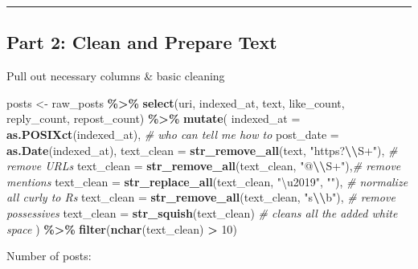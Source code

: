 \documentclass[
]{article}
\newenvironment{Shaded}{\begin{snugshade}}{\end{snugshade}}
\newcommand{\AttributeTok}[1]{\textcolor[rgb]{0.13,0.29,0.53}{#1}}
\newcommand{\CommentTok}[1]{\textcolor[rgb]{0.56,0.35,0.01}{\textit{#1}}}
\newcommand{\DecValTok}[1]{\textcolor[rgb]{0.00,0.00,0.81}{#1}}
\newcommand{\FunctionTok}[1]{\textcolor[rgb]{0.13,0.29,0.53}{\textbf{#1}}}
\newcommand{\NormalTok}[1]{#1}
\newcommand{\OtherTok}[1]{\textcolor[rgb]{0.56,0.35,0.01}{#1}}
\newcommand{\SpecialCharTok}[1]{\textcolor[rgb]{0.81,0.36,0.00}{\textbf{#1}}}
\newcommand{\StringTok}[1]{\textcolor[rgb]{0.31,0.60,0.02}{#1}}
\begin{document}
\begin{center}\rule{0.5\linewidth}{0.5pt}\end{center}

\subsection{Part 2: Clean and Prepare
Text}\label{part-2-clean-and-prepare-text}

Pull out necessary columns \& basic cleaning

\begin{Shaded}
\begin{Highlighting}[]
\NormalTok{posts }\OtherTok{\textless{}{-}}\NormalTok{ raw\_posts }\SpecialCharTok{\%\textgreater{}\%}
  \FunctionTok{select}\NormalTok{(uri, indexed\_at, text, like\_count, reply\_count, repost\_count) }\SpecialCharTok{\%\textgreater{}\%}
  \FunctionTok{mutate}\NormalTok{(}
    \AttributeTok{indexed\_at =} \FunctionTok{as.POSIXct}\NormalTok{(indexed\_at), }\CommentTok{\# who can tell me how to }
    \AttributeTok{post\_date  =} \FunctionTok{as.Date}\NormalTok{(indexed\_at),}
    \AttributeTok{text\_clean =} \FunctionTok{str\_remove\_all}\NormalTok{(text, }\StringTok{"https?}\SpecialCharTok{\textbackslash{}\textbackslash{}}\StringTok{S+"}\NormalTok{), }\CommentTok{\# remove URLs}
    \AttributeTok{text\_clean =} \FunctionTok{str\_remove\_all}\NormalTok{(text\_clean, }\StringTok{"@}\SpecialCharTok{\textbackslash{}\textbackslash{}}\StringTok{S+"}\NormalTok{),}\CommentTok{\# remove mentions}
    \AttributeTok{text\_clean =} \FunctionTok{str\_replace\_all}\NormalTok{(text\_clean, }\StringTok{"\textbackslash{}u2019"}\NormalTok{, }\StringTok{"\textquotesingle{}"}\NormalTok{), }\CommentTok{\# normalize all curly \textquotesingle{} to R\textquotesingle{}s \textquotesingle{}}
    \AttributeTok{text\_clean =} \FunctionTok{str\_remove\_all}\NormalTok{(text\_clean, }\StringTok{"\textquotesingle{}s}\SpecialCharTok{\textbackslash{}\textbackslash{}}\StringTok{b"}\NormalTok{), }\CommentTok{\# remove possessives}
    \AttributeTok{text\_clean =} \FunctionTok{str\_squish}\NormalTok{(text\_clean) }\CommentTok{\# cleans all the added white space }
\NormalTok{  ) }\SpecialCharTok{\%\textgreater{}\%}
  \FunctionTok{filter}\NormalTok{(}\FunctionTok{nchar}\NormalTok{(text\_clean) }\SpecialCharTok{\textgreater{}} \DecValTok{10}\NormalTok{)}
\end{Highlighting}
\end{Shaded}

Number of posts:
\end{document}
